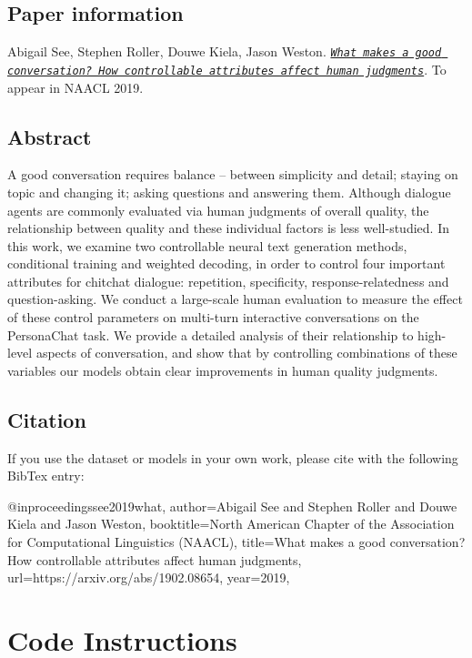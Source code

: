 \subsection*{Paper information}

Abigail See, Stephen Roller, Douwe Kiela, Jason Weston. {\itshape \href{https://arxiv.org/abs/1902.08654}{\tt What makes a good conversation? How controllable attributes affect human judgments}}. To appear in N\+A\+A\+CL 2019.

\subsection*{Abstract}

A good conversation requires balance -- between simplicity and detail; staying on topic and changing it; asking questions and answering them. Although dialogue agents are commonly evaluated via human judgments of overall quality, the relationship between quality and these individual factors is less well-\/studied. In this work, we examine two controllable neural text generation methods, conditional training and weighted decoding, in order to control four important attributes for chitchat dialogue\+: repetition, specificity, response-\/relatedness and question-\/asking. We conduct a large-\/scale human evaluation to measure the effect of these control parameters on multi-\/turn interactive conversations on the Persona\+Chat task. We provide a detailed analysis of their relationship to high-\/level aspects of conversation, and show that by controlling combinations of these variables our models obtain clear improvements in human quality judgments.

\subsection*{Citation}

If you use the dataset or models in your own work, please cite with the following Bib\+Tex entry\+: \begin{DoxyVerb}@inproceedings{see2019what,
  author={Abigail See and Stephen Roller and Douwe Kiela and Jason Weston},
  booktitle={North American Chapter of the Association for Computational Linguistics (NAACL)},
  title={What makes a good conversation? How controllable attributes affect human judgments},
  url={https://arxiv.org/abs/1902.08654},
  year={2019},
}
\end{DoxyVerb}


\section*{Code Instructions}

